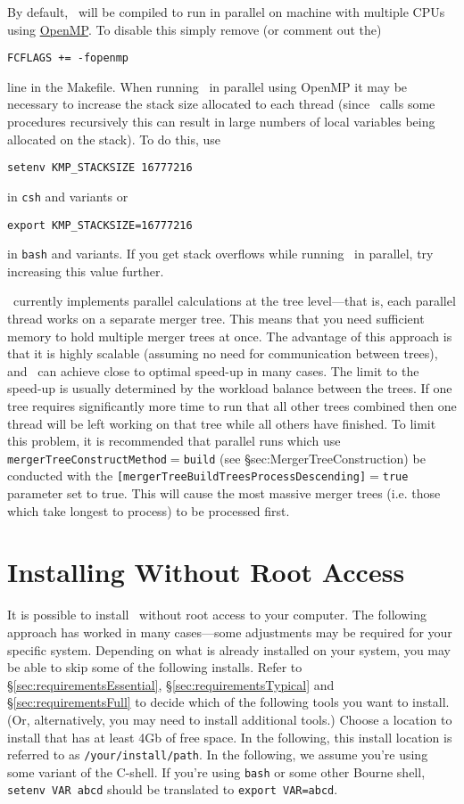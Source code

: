 By default, \glc\ will be compiled to run in parallel on machine with multiple CPUs using \href{http://openmp.org/wp/}{OpenMP}. To disable this simply remove (or comment out the)
\begin{verbatim}
FCFLAGS += -fopenmp
\end{verbatim}
line in the Makefile. When running \glc\ in parallel using OpenMP it may be necessary to increase the stack size allocated to each thread (since \glc\ calls some procedures recursively this can result in large numbers of local variables being allocated on the stack). To do this, use
\begin{verbatim}
setenv KMP_STACKSIZE 16777216
\end{verbatim}
in {\tt csh} and variants or
\begin{verbatim}
export KMP_STACKSIZE=16777216
\end{verbatim}
in {\tt bash} and variants. If you get stack overflows while running \glc\ in parallel, try increasing this value further.

\glc\ currently implements parallel calculations at the tree level---that is, each parallel thread works on a separate merger tree. This means that you need sufficient memory to hold multiple merger trees at once. The advantage of this approach is that it is highly scalable (assuming no need for communication between trees), and \glc\ can achieve close to optimal speed-up in many cases. The limit to the speed-up is usually determined by the workload balance between the trees. If one tree requires significantly more time to run that all other trees combined then one thread will be left working on that tree while all others have finished. To limit this problem, it is recommended that parallel runs which use {\tt mergerTreeConstructMethod}$=${\tt build} (see \S{sec:MergerTreeConstruction}) be conducted with the {\tt [mergerTreeBuildTreesProcessDescending]}$=${\tt true} parameter set to true. This will cause the most massive merger trees (i.e. those which take longest to process) to be processed first.

\section{Installing Without Root Access}

It is possible to install \glc\ without root access to your computer. The following approach has worked in many cases---some adjustments may be required for your specific system. Depending on what is already installed on your system, you may be able to skip some of the following installs. Refer to \S\ref{sec:requirementsEssential}, \S\ref{sec:requirementsTypical} and \S\ref{sec:requirementsFull} to decide which of the following tools you want to install. (Or, alternatively, you may need to install additional tools.) Choose a location to install that has at least 4Gb of free space. In the following, this install location is referred to as {\tt /your/install/path}. In the following, we assume you're using some variant of the C-shell. If you're using {\tt bash} or some other Bourne shell, {\tt setenv VAR abcd} should be translated to {\tt export VAR=abcd}.

